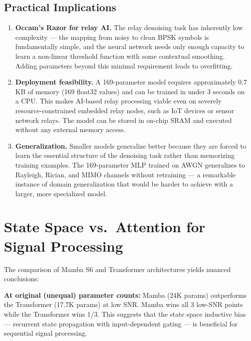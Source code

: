 \subsection{Practical Implications}\label{sec:practical-implications}

\begin{enumerate}
\def\labelenumi{\arabic{enumi}.}
\item
  \textbf{Occam's Razor for relay AI.} The relay denoising task has inherently low complexity --- the mapping from noisy to clean BPSK symbols is fundamentally simple, and the neural network needs only enough capacity to learn a non-linear threshold function with some contextual smoothing. Adding parameters beyond this minimal requirement leads to overfitting.
\item
  \textbf{Deployment feasibility.} A 169-parameter model requires approximately 0.7 KB of memory (169 float32 values) and can be trained in under 3 seconds on a CPU. This makes AI-based relay processing viable even on severely resource-constrained embedded relay nodes, such as IoT devices or sensor network relays. The model can be stored in on-chip SRAM and executed without any external memory access.
\item
  \textbf{Generalization.} Smaller models generalize better because they are forced to learn the essential structure of the denoising task rather than memorizing training examples. The 169-parameter MLP trained on AWGN generalizes to Rayleigh, Rician, and MIMO channels without retraining --- a remarkable instance of domain generalization that would be harder to achieve with a larger, more specialized model.
\end{enumerate}

\section{State Space vs.~Attention for Signal Processing}\label{sec:state-space-vs.-attention-for-signal-processing}

The comparison of Mamba S6 and Transformer architectures yields nuanced conclusions:

\textbf{At original (unequal) parameter counts:} Mamba (24K params) outperforms the Transformer (17.7K params) at low SNR. Mamba wins all 3 low-SNR points while the Transformer wins 1/3. This suggests that the state space inductive bias --- recurrent state propagation with input-dependent gating --- is beneficial for sequential signal processing.

